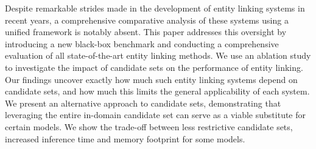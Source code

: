 Despite remarkable strides made in the development of entity linking systems in recent years, a comprehensive comparative analysis of these systems using a unified framework is notably absent. This paper addresses this oversight by introducing a new black-box benchmark and conducting a comprehensive evaluation of all state-of-the-art entity linking methods. We use an ablation study to investigate the impact of candidate sets on the performance of entity linking. Our findings uncover exactly how much such entity linking systems depend on candidate sets, and how much this limits the general applicability of each system.  We present an alternative approach to candidate sets, demonstrating that leveraging the entire in-domain candidate set can serve as a viable substitute for certain models. We show the trade-off between less restrictive candidate sets, increased inference time and memory footprint for some models.